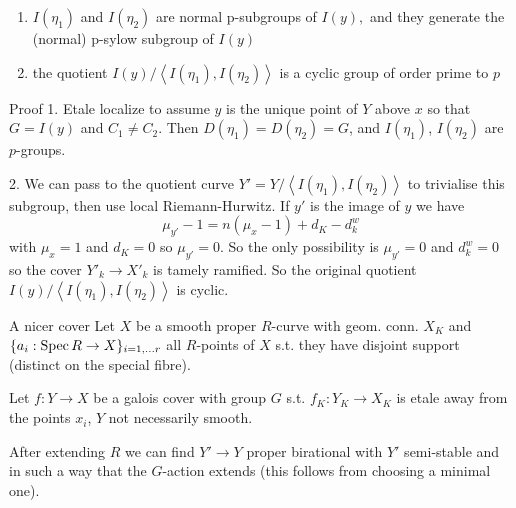 \begin{frame}
\begin{proposition}
        \begin{enumerate}
            \item $I\left(\eta_{1}\right)$ and $I\left(\eta_{2}\right)$ are normal p-subgroups of $I(y),$ and they generate the (normal) p-sylow subgroup of $I(y)$
            \item the quotient $I(y) /\left\langle I\left(\eta_{1}\right), I\left(\eta_{2}\right)\right\rangle$ is a cyclic group of order prime to $p$
        \end{enumerate}
    \end{proposition}
    \end{frame}\begin{frame}
    \begin{block}{Proof}
        1. Etale localize to assume $y$ is the unique point of $Y$ above $x$ so that $G = I(y)$ and $C_1 \ne C_2$.
        Then $D(\eta_1) = D(\eta_2) = G$, and $I(\eta_1)$, $I(\eta_2)$ are $p$-groups.

        2. We can pass to the quotient curve $Y' = Y/\left\langle I\left(\eta_{1}\right), I\left(\eta_{2}\right)\right\rangle$ to trivialise this subgroup, then use local Riemann-Hurwitz. If $y'$ is the image of $y$ we have
        $$\mu _{y'} - 1 = n(\mu _x - 1) + d_K - d_k^w$$
        with $\mu _x=1$ and $d_K=0$ so $\mu _{y'}  = 0$. So the only possibility is $\mu _{y'} = 0$ and $d^w_k= 0$ so the cover $Y'_k \to X'_k$ is tamely ramified. So the original quotient $I(y) /\left\langle I\left(\eta_{1}\right), I\left(\eta_{2}\right)\right\rangle$ is cyclic.
    \end{block}
    \end{frame}\begin{frame}{A nicer cover}
        Let $X$ be a smooth proper $R$-curve with geom. conn. $X_K$ and $\{a_i : \operatorname{Spec} R \to X\}_{i = 1, \ldots r}$ all $R$-points of $X$ s.t. they have disjoint support (distinct on the special fibre).

        Let $f \colon  Y \to X$ be a galois cover with group $G$ s.t. $f_K \colon  Y_K \to X_K$ is etale away from the points $x_i$, $Y$ not necessarily smooth.

        After extending $R$ we can find $Y' \to Y$ proper birational with $Y'$ semi-stable and in such a way that the $G$-action extends (this follows from choosing  a minimal one).


\end{frame}
